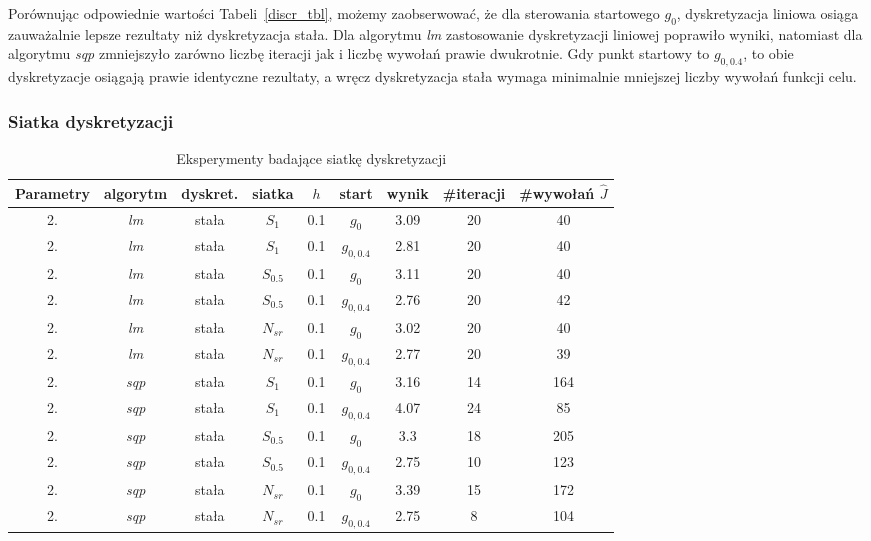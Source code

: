 \documentclass[11pt]{article}
\begin{document}
Porównując odpowiednie wartości Tabeli~\ref{discr_tbl}, możemy zaobserwować, że dla sterowania startowego $g_0$, dyskretyzacja liniowa osiąga zauważalnie lepsze rezultaty niż dyskretyzacja stała. Dla algorytmu {\it lm\/} zastosowanie dyskretyzacji liniowej poprawiło wyniki, natomiast dla algorytmu {\it sqp\/} zmniejszyło zarówno liczbę iteracji jak i liczbę wywołań prawie dwukrotnie. Gdy punkt startowy to $g_{0,0.4}$, to obie dyskretyzacje osiągają prawie identyczne rezultaty, a wręcz dyskretyzacja stała wymaga minimalnie mniejszej liczby wywołań funkcji celu. 

\subsubsection{Siatka dyskretyzacji}

\begin{table}[h!]
  \begin{center}
    \begin{tabular}{|c|c|c|c|c|c|c|c|c|}
      \hline
      Parametry & algorytm & dyskret. & siatka & $h$ & start & wynik & \#iteracji & \#wywołań $\hat{J}$ \\
      \hline
      2. & {\it lm\/} & stała & $S_1$ & 0.1 & $g_0$ & 3.09 & 20 & 40 \\
      \hline
      2. & {\it lm\/} & stała & $S_1$ & 0.1 & $g_{0,0.4}$ & 2.81 & 20 & 40 \\
      \hline
      2. & {\it lm\/} & stała & $S_{0.5}$ & 0.1 & $g_0$ & 3.11 & 20 & 40 \\
      \hline
      2. & {\it lm\/} & stała & $S_{0.5}$ & 0.1 & $g_{0,0.4}$ & 2.76 & 20 & 42 \\
      \hline
      2. & {\it lm\/} & stała & $N_{sr}$ & 0.1 & $g_0$ & 3.02 & 20 & 40 \\
      \hline
      2. & {\it lm\/} & stała & $N_{sr}$ & 0.1 & $g_{0,0.4}$ & 2.77 & 20 & 39 \\
      \hline
      2. & {\it sqp\/} & stała & $S_1$ & 0.1 & $g_0$ & 3.16 & 14 & 164 \\
      \hline
      2. & {\it sqp\/} & stała & $S_1$ & 0.1 & $g_{0,0.4}$ & 4.07 & 24 & 85 \\
      \hline
      2. & {\it sqp\/} & stała & $S_{0.5}$ & 0.1 & $g_0$ & 3.3 & 18 & 205 \\
      \hline
      2. & {\it sqp\/} & stała & $S_{0.5}$ & 0.1 & $g_{0,0.4}$ & 2.75 & 10 & 123 \\
      \hline
      2. & {\it sqp\/} & stała & $N_{sr}$ & 0.1 & $g_0$ & 3.39 & 15 & 172 \\
      \hline
      2. & {\it sqp\/} & stała & $N_{sr}$ & 0.1 & $g_{0,0.4}$ & 2.75 & 8 & 104 \\
      \hline
    \end{tabular}
    \caption{Eksperymenty badające siatkę dyskretyzacji}\label{grid_tbl}
  \end{center}
\end{table}
\end{document}
